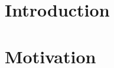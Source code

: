 \documentclass[11pt, a4paper]{report}
\theoremstyle{mydefinition}
\newcommand{\1}{\mathds{1}}
\begin{document}




\tableofcontents

\chapter{Introduction}


\chapter{Motivation}



    
\end{document}

